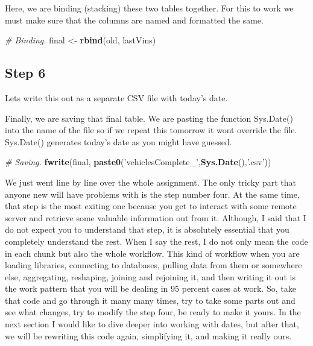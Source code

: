 \documentclass[]{book}
\newenvironment{Shaded}{\begin{snugshade}}{\end{snugshade}}
\newcommand{\CommentTok}[1]{\textcolor[rgb]{0.56,0.35,0.01}{\textit{#1}}}
\newcommand{\KeywordTok}[1]{\textcolor[rgb]{0.13,0.29,0.53}{\textbf{#1}}}
\newcommand{\NormalTok}[1]{#1}
\newcommand{\StringTok}[1]{\textcolor[rgb]{0.31,0.60,0.02}{#1}}
\begin{document}
Here, we are binding (stacking) these two tables together. For this to work we must make sure that the columns are named and formatted the same.

\begin{Shaded}
\begin{Highlighting}[]
\CommentTok{# Binding.}
\NormalTok{final <-}\StringTok{ }\KeywordTok{rbind}\NormalTok{(old, lastVins)}
\end{Highlighting}
\end{Shaded}

\hypertarget{step-6-1}{%
\subsection{Step 6}\label{step-6-1}}

Lets write this out as a separate CSV file with today's date.

Finally, we are saving that final table. We are pasting the function Sys.Date() into the name of the file so if we repeat this tomorrow it wont override the file. Sys.Date() generates today's date as you might have guessed.

\begin{Shaded}
\begin{Highlighting}[]
\CommentTok{# Saving.}
\KeywordTok{fwrite}\NormalTok{(final, }\KeywordTok{paste0}\NormalTok{(}\StringTok{'vehiclesComplete_'}\NormalTok{,}\KeywordTok{Sys.Date}\NormalTok{(),}\StringTok{'.csv'}\NormalTok{))}
\end{Highlighting}
\end{Shaded}

We just went line by line over the whole assignment. The only tricky part that anyone new will have problems with is the step number four. At the same time, that step is the most exiting one because you get to interact with some remote server and retrieve some valuable information out from it. Although, I said that I do not expect you to understand that step, it is absolutely essential that you completely understand the rest. When I say the rest, I do not only mean the code in each chunk but also the whole workflow. This kind of workflow when you are loading libraries, connecting to databases, pulling data from them or somewhere else, aggregating, reshaping, joining and rejoining it, and then writing it out is the work pattern that you will be dealing in 95 percent cases at work. So, take that code and go through it many many times, try to take some parts out and see what changes, try to modify the step four, be ready to make it yours. In the next section I would like to dive deeper into working with dates, but after that, we will be rewriting this code again, simplifying it, and making it really ours.
\end{document}
